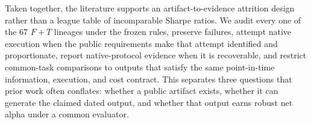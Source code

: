 Taken together, the literature supports an artifact-to-evidence attrition
design rather than a league table of incomparable Sharpe ratios.  We audit
every one of the 67 \(F+T\) lineages under the frozen rules, preserve failures,
attempt native execution when the public requirements make that attempt
identified and proportionate, report native-protocol evidence when it is
recoverable, and restrict common-task comparisons to outputs that satisfy the
same point-in-time information, execution, and cost contract.  This separates
three questions that prior work often conflates: whether a public artifact
exists, whether it can generate the claimed dated output, and whether that
output earns robust net alpha under a common evaluator.
